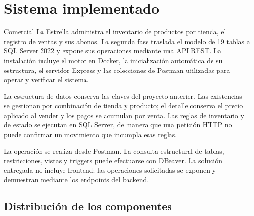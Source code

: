 \section{Sistema implementado}
Comercial La Estrella administra el inventario de productos por tienda, el registro de ventas y sus abonos. La segunda fase traslada el modelo de 19 tablas a SQL Server 2022 y expone sus operaciones mediante una API REST. La instalación incluye el motor en Docker, la inicialización automática de su estructura, el servidor Express y las colecciones de Postman utilizadas para operar y verificar el sistema.

La estructura de datos conserva las claves del proyecto anterior. Las existencias se gestionan por combinación de tienda y producto; el detalle conserva el precio aplicado al vender y los pagos se acumulan por venta. Las reglas de inventario y de estado se ejecutan en SQL Server, de manera que una petición HTTP no puede confirmar un movimiento que incumpla esas reglas.

La operación se realiza desde Postman. La consulta estructural de tablas, restricciones, vistas y triggers puede efectuarse con DBeaver. La solución entregada no incluye frontend: las operaciones solicitadas se exponen y demuestran mediante los endpoints del backend.

\subsection{Distribución de los componentes}
\begin{center}
\end{center}

